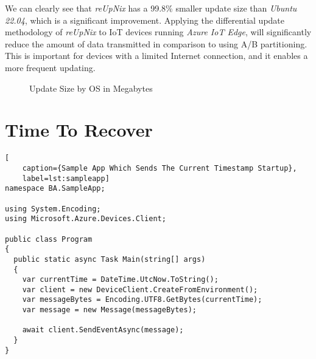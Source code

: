 \noindent
We can clearly see that \textit{reUpNix} has a 99.8\% smaller update size
than \textit{Ubuntu 22.04}, which is a significant improvement. Applying the
differential update methodology of \textit{reUpNix} to \ac{IoT} devices
running \textit{Azure IoT Edge}, will significantly reduce the amount of data
transmitted in comparison to using A/B partitioning. This is important for
devices with a limited Internet connection, and it enables a more frequent updating.

\begin{figure}[htbp]
  \centering
\caption{Update Size by OS in Megabytes}
\end{figure}

\clearpage

\section{Time To Recover}
\begin{lstlisting}[
    caption={Sample App Which Sends The Current Timestamp Startup},
    label=lst:sampleapp]
namespace BA.SampleApp;

using System.Encoding;
using Microsoft.Azure.Devices.Client;

public class Program
{
  public static async Task Main(string[] args)
  {
    var currentTime = DateTime.UtcNow.ToString();
    var client = new DeviceClient.CreateFromEnvironment();
    var messageBytes = Encoding.UTF8.GetBytes(currentTime);
    var message = new Message(messageBytes);

    await client.SendEventAsync(message);
  }
}
\end{lstlisting}

